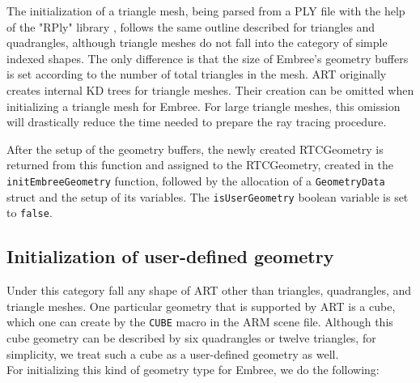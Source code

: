 The initialization of a triangle mesh, being parsed from a PLY file with the help of the "RPly" library \cite{rply2016}, follows the same outline described for triangles and quadrangles, although triangle meshes do not fall into the category of simple indexed shapes. The only difference is that the size of Embree's geometry buffers is set according to the number of total triangles in the mesh. ART originally creates internal KD trees for triangle meshes. Their creation can be omitted when initializing a triangle mesh for Embree. For large triangle meshes, this omission will drastically reduce the time needed to prepare the ray tracing procedure.

After the setup of the geometry buffers, the newly created RTCGeometry is returned from this function and assigned to the RTCGeometry, created in the \texttt{initEmbreeGeometry} function, followed by the allocation of a \texttt{GeometryData} struct and the setup of its variables. The \texttt{isUserGeometry} boolean variable is set to \texttt{false}.

\subsection{Initialization of user-defined geometry}
\label{sec:init_user}
Under this category fall any shape of ART other than triangles, quadrangles, and triangle meshes. One particular geometry that is supported by ART is a cube, which one can create by the \texttt{CUBE} macro in the ARM scene file. Although this cube geometry can be described by six quadrangles or twelve triangles, for simplicity, we treat such a cube as a user-defined geometry as well. 
\\

For initializing this kind of geometry type for Embree, we do the following:

